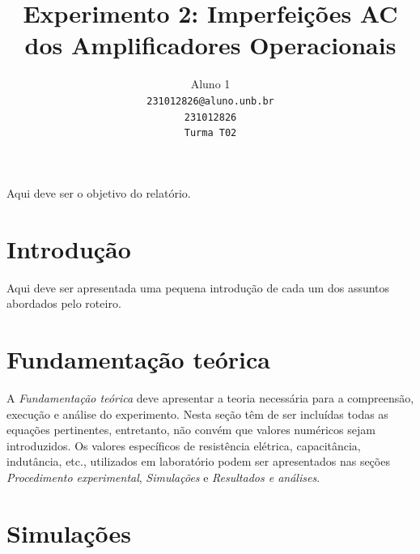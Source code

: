 \documentclass[10pt,twocolumn,letterpaper]{article}
\begin{document}
\title{Experimento 2: Imperfeições AC dos Amplificadores Operacionais}

\author{Aluno 1\\
{\tt\small 231012826@aluno.unb.br}\\
{\tt\small 231012826}\\
{\tt\small Turma T02}
}

\maketitle


\begin{objetivo}
Aqui deve ser o objetivo do relatório.

\end{objetivo}

\section{Introdução}
Aqui deve ser apresentada uma pequena introdução de cada um dos assuntos abordados pelo roteiro.

\section{Fundamentação teórica}

A {\em Fundamentação teórica} deve apresentar a teoria necessária para a compreensão, execução e análise do experimento. Nesta seção têm de ser incluídas todas as equações pertinentes, entretanto, não convém que valores numéricos sejam introduzidos. Os valores específicos de resistência elétrica, capacitância, indutância, etc., utilizados em la\-bo\-ra\-tó\-rio podem ser apresentados nas seções {\em Procedimento experimental}, {\em Simulações} e {\em Resultados e análises}. 




\newpage
\section{Simulações}
\end{document}
